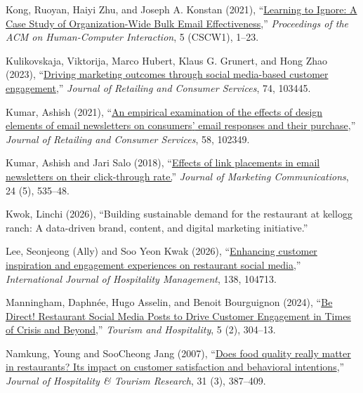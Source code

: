 \documentclass[
  12pt,
  letterpaper,
  DIV=11,
  numbers=noendperiod]{scrartcl}
\newlength{\cslhangindent}
\newenvironment{CSLReferences}[2] %
 {\begin{list}{}{%
  \setlength{\itemindent}{0pt}
  \setlength{\leftmargin}{0pt}
  \setlength{\parsep}{0pt}
  \ifodd #1
   \setlength{\leftmargin}{\cslhangindent}
   \setlength{\itemindent}{-1\cslhangindent}
  \fi
  \setlength{\itemsep}{#2\baselineskip}}}
 {\end{list}}
\begin{document}
\begin{CSLReferences}{1}{0}
Kong, Ruoyan, Haiyi Zhu, and Joseph A. Konstan (2021),
{``\href{https://doi.org/10.1145/3449154}{Learning to Ignore: A Case
Study of Organization-Wide Bulk Email Effectiveness},''}
\emph{Proceedings of the ACM on Human-Computer Interaction}, 5 (CSCW1),
1--23.

Kulikovskaja, Viktorija, Marco Hubert, Klaus G. Grunert, and Hong Zhao
(2023),
{``\href{https://doi.org/10.1016/j.jretconser.2023.103445}{Driving
marketing outcomes through social media-based customer engagement},''}
\emph{Journal of Retailing and Consumer Services}, 74, 103445.

Kumar, Ashish (2021),
{``\href{https://doi.org/10.1016/j.jretconser.2020.102349}{An empirical
examination of the effects of design elements of email newsletters on
consumers{'} email responses and their purchase},''} \emph{Journal of
Retailing and Consumer Services}, 58, 102349.

Kumar, Ashish and Jari Salo (2018),
{``\href{https://doi.org/10.1080/13527266.2016.1147485}{Effects of link
placements in email newsletters on their click-through rate.}''}
\emph{Journal of Marketing Communications}, 24 (5), 535--48.

Kwok, Linchi (2026), {``Building sustainable demand for the restaurant
at kellogg ranch: A data-driven brand, content, and digital marketing
initiative.''}

Lee, Seonjeong (Ally) and Soo Yeon Kwak (2026),
{``\href{https://doi.org/10.1016/j.ijhm.2026.104713}{Enhancing customer
inspiration and engagement experiences on restaurant social media},''}
\emph{International Journal of Hospitality Management}, 138, 104713.

Manningham, Daphnée, Hugo Asselin, and Benoit Bourguignon (2024),
{``\href{https://doi.org/10.3390/tourhosp5020020}{Be Direct! Restaurant
Social Media Posts to Drive Customer Engagement in Times of Crisis and
Beyond},''} \emph{Tourism and Hospitality}, 5 (2), 304--13.

Namkung, Young and SooCheong Jang (2007),
{``\href{https://doi.org/10.1177/1096348007299924}{Does food quality
really matter in restaurants? Its impact on customer satisfaction and
behavioral intentions},''} \emph{Journal of Hospitality \& Tourism
Research}, 31 (3), 387--409.


\end{CSLReferences}
\end{document}
